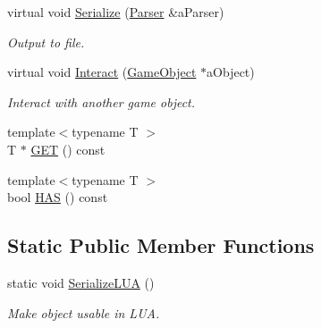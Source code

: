 \begin{DoxyCompactItemize}
virtual void \hyperlink{classGameObject_a629e23a33e07ca8f56596f69025c6d55}{Serialize} (\hyperlink{classParser}{Parser} \&a\+Parser)
\begin{DoxyCompactList}\small\item\em Output to file. \end{DoxyCompactList}\item 
virtual void \hyperlink{classGameObject_ad06af98844b25a28e6ede780db47a126}{Interact} (\hyperlink{classGameObject}{Game\+Object} $\ast$a\+Object)
\begin{DoxyCompactList}\small\item\em Interact with another game object. \end{DoxyCompactList}\item 
{\footnotesize template$<$typename T $>$ }\\T $\ast$ \hyperlink{classGameObject_a31f048bff84470cbb5397c947ef6834c}{G\+ET} () const 
\item 
{\footnotesize template$<$typename T $>$ }\\bool \hyperlink{classGameObject_aee47fe8f587fc5e989475286ed17d39b}{H\+AS} () const 
\end{DoxyCompactItemize}
\subsection*{Static Public Member Functions}
\begin{DoxyCompactItemize}
\item 
static void \hyperlink{classGameObject_a2eff7f320a2cd856a5ca3a3eb108ae5d}{Serialize\+L\+UA} ()
\begin{DoxyCompactList}\small\item\em Make object usable in L\+UA. \end{DoxyCompactList}\end{DoxyCompactItemize}
